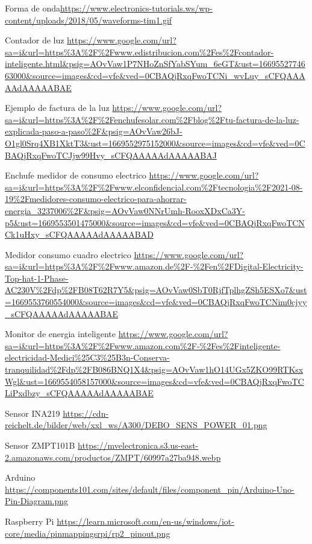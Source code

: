 \begin{thebibliography}{9}
Forma de onda\url{https://www.electronics-tutorials.ws/wp-content/uploads/2018/05/waveforms-tim1.gif}

Contador de luz \url{https://www.google.com/url?sa=i&url=https%3A%2F%2Fwww.edistribucion.com%2Fes%2Fcontador-inteligente.html&psig=AOvVaw1P7NHoZnSfYabSYum_6eGT&ust=1669552774663000&source=images&cd=vfe&ved=0CBAQjRxqFwoTCNi_wvLuy_sCFQAAAAAdAAAAABAE}

Ejemplo de factura de la luz \url{https://www.google.com/url?sa=i&url=https%3A%2F%2Fenchufesolar.com%2Fblog%2Ftu-factura-de-la-luz-explicada-paso-a-paso%2F&psig=AOvVaw26bJ-O1gl0Srq4XB1XktT3&ust=1669552975152000&source=images&cd=vfe&ved=0CBAQjRxqFwoTCJjw99Hvy_sCFQAAAAAdAAAAABAJ}

Enchufe medidor de consumo electrico \url{https://www.google.com/url?sa=i&url=https%3A%2F%2Fwww.elconfidencial.com%2Ftecnologia%2F2021-08-19%2Fmedidores-consumo-electrico-para-ahorrar-energia_3237006%2F&psig=AOvVaw0NNrUmh-RooxXDxCa3Y-p5&ust=1669553501475000&source=images&cd=vfe&ved=0CBAQjRxqFwoTCNCk1uHxy_sCFQAAAAAdAAAAABAD}

Medidor consumo cuadro electrico \url{https://www.google.com/url?sa=i&url=https%3A%2F%2Fwww.amazon.de%2F-%2Fen%2FDigital-Electricity-Top-hat-1-Phase-AC230V%2Fdp%2FB08T62R7Y5&psig=AOvVaw0SbT0RjfTplhgZSh5ESXo7&ust=1669553760554000&source=images&cd=vfe&ved=0CBAQjRxqFwoTCNim0cjyy_sCFQAAAAAdAAAAABAE}

Monitor de energia inteligente \url{https://www.google.com/url?sa=i&url=https%3A%2F%2Fwww.amazon.com%2F-%2Fes%2Finteligente-electricidad-Medici%25C3%25B3n-Conserva-tranquilidad%2Fdp%2FB086BNQ1X4&psig=AOvVaw1hO14UGx5ZKO99RTKsxWgl&ust=1669554058157000&source=images&cd=vfe&ved=0CBAQjRxqFwoTCLiPxdbzy_sCFQAAAAAdAAAAABAE}

Sensor INA219 \url{https://cdn-reichelt.de/bilder/web/xxl_ws/A300/DEBO_SENS_POWER_01.png}

Sensor ZMPT101B \url{https://mvelectronica.s3.us-east-2.amazonaws.com/productos/ZMPT/60997a27ba948.webp}

Arduino \url{https://components101.com/sites/default/files/component_pin/Arduino-Uno-Pin-Diagram.png}

Raspberry Pi \url{https://learn.microsoft.com/en-us/windows/iot-core/media/pinmappingsrpi/rp2_pinout.png}


\end{thebibliography}

